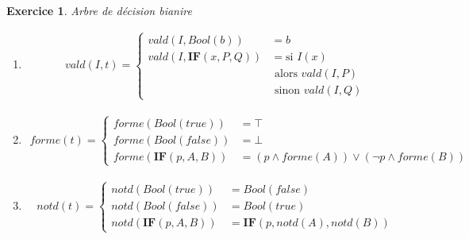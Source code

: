 \documentclass{article}
\theoremstyle{plain}
\newtheorem{exo}{Exercice}%
\begin{document}
\begin{exo}Arbre de décision bianire
\begin{enumerate}
    \item \begin{align*}
        vald(I, t) = \begin{cases}
            vald(I, Bool(b)) &= b\\
            vald(I, \textbf{IF}(x, P, Q)) &=  \text{si } I(x) \\ 
                        &\text{ alors } vald(I, P) \\
                        &\text{ sinon } vald(I, Q)
        \end{cases}
    \end{align*}
    \item \begin{align*}
        forme(t) = \begin{cases}
            forme(Bool(true)) &= \top \\
            forme(Bool(false)) &= \bot \\
            forme(\textbf{IF}(p, A, B)) &= (p \wedge forme(A)) \vee (\neg p \wedge forme(B))
        \end{cases}
    \end{align*}

    \item \begin{align*}
        notd(t) = \begin{cases}
            notd(Bool(true)) &= Bool(false) \\
            notd(Bool(false)) &= Bool(true) \\
            notd(\textbf{IF}(p, A, B)) &= \textbf{IF}(p, notd(A), notd(B))
        \end{cases}
    \end{align*}


\end{enumerate}
\end{exo}
\end{document}
